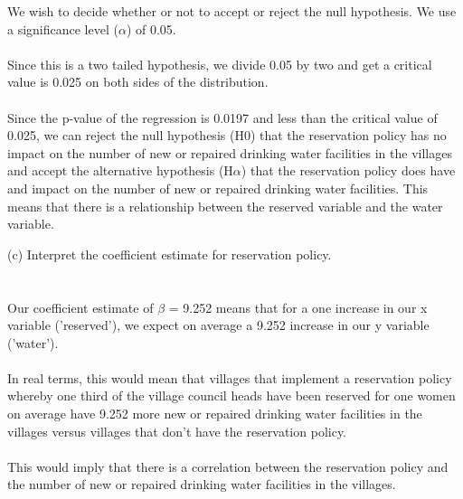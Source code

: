 \documentclass[12pt,letterpaper]{article}
\begin{document}

We wish to decide whether or not to accept or reject the null hypothesis.
We use a significance level ($\alpha$) of 0.05.
\\\\
Since this is a two tailed hypothesis, we divide 0.05 by two and get a
critical value is 0.025 on both sides of the distribution. 
\\\\
Since the p-value of the regression is 0.0197 and less than the critical value of 0.025, we can reject the null hypothesis (H0) that the reservation policy has no impact on the number of new or repaired drinking water facilities in the villages and accept the alternative hypothesis (H$\alpha$) that the reservation policy does have and impact on the number of new or repaired drinking water facilities. This means that there is a relationship between the reserved variable and the water variable. 

\newpage
(c) Interpret the coefficient estimate for reservation policy. 
\\\\\\
Our coefficient estimate of $\beta$ = 9.252 means that for a one increase in our x variable ('reserved'), we expect on average a 9.252 increase in our y variable ('water').
\\\\
In real terms, this would mean that villages that implement a reservation policy whereby one third of the village council heads have been reserved for one women on average have 9.252 more new or repaired drinking water facilities in the villages versus villages that don't have the reservation policy.
\\\\
This would imply that there is a correlation between the reservation policy and the number of new or repaired drinking water facilities in the villages. 
  
 
 
\end{document}
